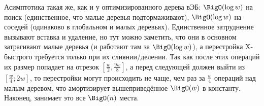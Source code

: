Асимптотика такая же, как и у оптимизированного дерева вЭБ: $\BigO(\log w)$ на поиск (единственное, что малые деревья подтормаживают), $\BigO(\log w)$ на соседей (одинаково в глобальном и малых деревьях). Единственное затруднение вызывают вставка и удаление, но тут можно заметить, что они в основном затрагивают малые деревья (и работают там за $\BigO(\log w)$), а перестройка X-быстрого требуется только при их слиянии/делении. Так как после этих операций их размер попадает на отрезок $[\frac{w}{2}, \frac{9w}{8}]$, а перед следующей должен выйти из $[\frac{w}{4}; 2w]$, то перестройки могут происходить не чаще, чем раз за $\frac{w}{4}$ операций над малым деревом, что амортизирует вышеприведённое $\BigO(w)$ в константу. Наконец, занимает это все $\BigO(n)$ места.